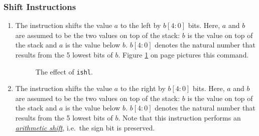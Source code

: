 \subsubsection{Shift Instructions}
\begin{enumerate}
\item The instruction 
      shifts the value $a$ to the left by $b[4:0]$ bits.  Here, $a$ and $b$ are assumed to be the two
      values on top of the stack:  $b$ is the value on top of the stack and $a$ is the value below $b$.
      $b[4:0]$ denotes the natural number that results from the 5 lowest bits of $b$.  Figure
      \ref{fig:ijvm-shl} on page \pageref{fig:ijvm-shl} pictures this command.

\setlength{\unitlength}{0.5cm}
\begin{figure}[!ht]
  \centering
{}
  \caption{The effect of \texttt{ishl}.}
  \label{fig:ijvm-shl}
\end{figure}
\item The instruction 
      shifts the value $a$ to the right by $b[4:0]$ bits.  Here, $a$ and $b$ are assumed to be the two
      values on top of the stack:  $b$ is the value on top of the stack and $a$ is the value below $b$.
      $b[4:0]$ denotes the natural number that results from the 5 lowest bits of $b$.  
      Note that this instruction performs an 
      \href{http://en.wikipedia.org/wiki/Arithmetic_shift}{\emph{arithmetic shift}}, 
      i.e.~the sign bit is preserved.
\end{enumerate}

